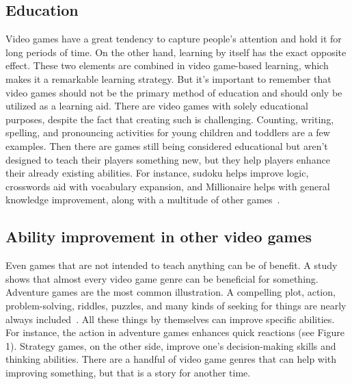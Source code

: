 \documentclass[10pt,twoside,english,a4paper]{article}
\begin{document}
\subsection{Education} \label{education}
Video games have a great tendency to capture people's attention and hold it for long periods of time. On the other hand, learning by itself has the exact opposite effect. These two elements are combined in video game-based learning, which makes it a remarkable learning strategy. But it's important to remember that video games should not be the primary method of education and should only be utilized as a learning aid. There are video games with solely educational purposes, despite the fact that creating such is challenging. Counting, writing, spelling, and pronouncing activities for young children and toddlers are a few examples. Then there are games still being considered educational but aren't designed to teach their players something new, but they help players enhance their already existing abilities. For instance, sudoku helps improve logic, crosswords aid with vocabulary expansion, and Millionaire helps with general knowledge improvement, along with a multitude of other games~\cite{learning}.

\subsection{Ability improvement in other video games} \label{improvement}
Even games that are not intended to teach anything can be of benefit. A study shows that almost every video game genre can be beneficial for something. Adventure games are the most common illustration. A compelling plot, action, problem-solving, riddles, puzzles, and many kinds of seeking for things are nearly always included~\cite{learning}. All these things by themselves can improve specific abilities. For instance, the action in adventure games enhances quick reactions (see Figure 1). Strategy games, on the other side, improve one's decision-making skills and thinking abilities. There are a handful of video game genres that can help with improving something, but that is a story for another time. 
\end{document}
